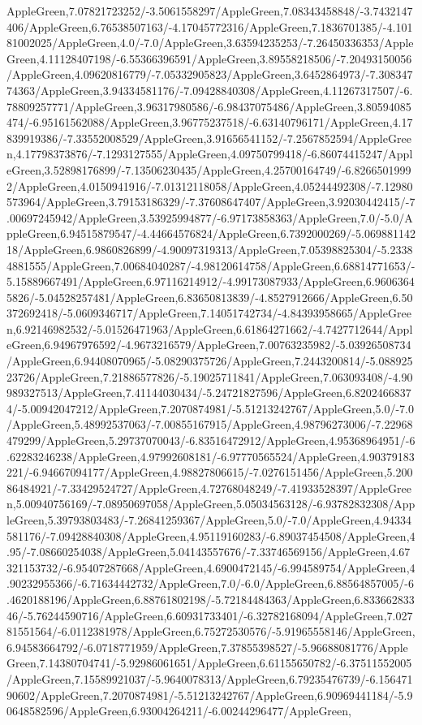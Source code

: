 {\begin{tikzternal}
AppleGreen,7.07821723252/-3.5061558297/AppleGreen,7.08343458848/-3.7432147406/AppleGreen,6.76538507163/-4.17045772316/AppleGreen,7.1836701385/-4.10181002025/AppleGreen,4.0/-7.0/AppleGreen,3.63594235253/-7.26450336353/AppleGreen,4.11128407198/-6.55366396591/AppleGreen,3.89558218506/-7.20493150056/AppleGreen,4.09620816779/-7.05332905823/AppleGreen,3.6452864973/-7.30834774363/AppleGreen,3.94334581176/-7.09428840308/AppleGreen,4.11267317507/-6.78809257771/AppleGreen,3.96317980586/-6.98437075486/AppleGreen,3.80594085474/-6.95161562088/AppleGreen,3.96775237518/-6.63140796171/AppleGreen,4.17839919386/-7.33552008529/AppleGreen,3.91656541152/-7.2567852594/AppleGreen,4.17798373876/-7.1293127555/AppleGreen,4.09750799418/-6.86074415247/AppleGreen,3.52898176899/-7.13506230435/AppleGreen,4.25700164749/-6.82665019992/AppleGreen,4.0150941916/-7.01312118058/AppleGreen,4.05244492308/-7.12980573964/AppleGreen,3.79153186329/-7.37608647407/AppleGreen,3.92030442415/-7.00697245942/AppleGreen,3.53925994877/-6.97173858363/AppleGreen,7.0/-5.0/AppleGreen,6.94515879547/-4.44664576824/AppleGreen,6.7392000269/-5.06988114218/AppleGreen,6.9860826899/-4.90097319313/AppleGreen,7.05398825304/-5.23384881555/AppleGreen,7.00684040287/-4.98120614758/AppleGreen,6.68814771653/-5.15889667491/AppleGreen,6.97116214912/-4.99173087933/AppleGreen,6.96063645826/-5.04528257481/AppleGreen,6.83650813839/-4.8527912666/AppleGreen,6.50372692418/-5.0609346717/AppleGreen,7.14051742734/-4.84393958665/AppleGreen,6.92146982532/-5.01526471963/AppleGreen,6.61864271662/-4.7427712644/AppleGreen,6.94967976592/-4.9673216579/AppleGreen,7.00763235982/-5.03926508734/AppleGreen,6.94408070965/-5.08290375726/AppleGreen,7.2443200814/-5.08892523726/AppleGreen,7.21886577826/-5.19025711841/AppleGreen,7.063093408/-4.90989327513/AppleGreen,7.41144030434/-5.24721827596/AppleGreen,6.82024668374/-5.00942047212/AppleGreen,7.2070874981/-5.51213242767/AppleGreen,5.0/-7.0/AppleGreen,5.48992537063/-7.00855167915/AppleGreen,4.98796273006/-7.22968479299/AppleGreen,5.29737070043/-6.83516472912/AppleGreen,4.95368964951/-6.62283246238/AppleGreen,4.97992608181/-6.97770565524/AppleGreen,4.90379183221/-6.94667094177/AppleGreen,4.98827806615/-7.0276151456/AppleGreen,5.20086484921/-7.33429524727/AppleGreen,4.72768048249/-7.41933528397/AppleGreen,5.00940756169/-7.08950697058/AppleGreen,5.05034563128/-6.93782832308/AppleGreen,5.39793803483/-7.26841259367/AppleGreen,5.0/-7.0/AppleGreen,4.94334581176/-7.09428840308/AppleGreen,4.95119160283/-6.89037454508/AppleGreen,4.95/-7.08660254038/AppleGreen,5.04143557676/-7.33746569156/AppleGreen,4.67321153732/-6.95407287668/AppleGreen,4.6900472145/-6.994589754/AppleGreen,4.90232955366/-6.71634442732/AppleGreen,7.0/-6.0/AppleGreen,6.88564857005/-6.4620188196/AppleGreen,6.88761802198/-5.72184484363/AppleGreen,6.83366283346/-5.76244590716/AppleGreen,6.60931733401/-6.32782168094/AppleGreen,7.02781551564/-6.0112381978/AppleGreen,6.75272530576/-5.91965558146/AppleGreen,6.94583664792/-6.0718771959/AppleGreen,7.37855398527/-5.96688081776/AppleGreen,7.14380704741/-5.92986061651/AppleGreen,6.61155650782/-6.37511552005/AppleGreen,7.15589921037/-5.9640078313/AppleGreen,6.79235476739/-6.15647190602/AppleGreen,7.2070874981/-5.51213242767/AppleGreen,6.90969441184/-5.90648582596/AppleGreen,6.93004264211/-6.00244296477/AppleGreen,
\end{tikzternal}}
